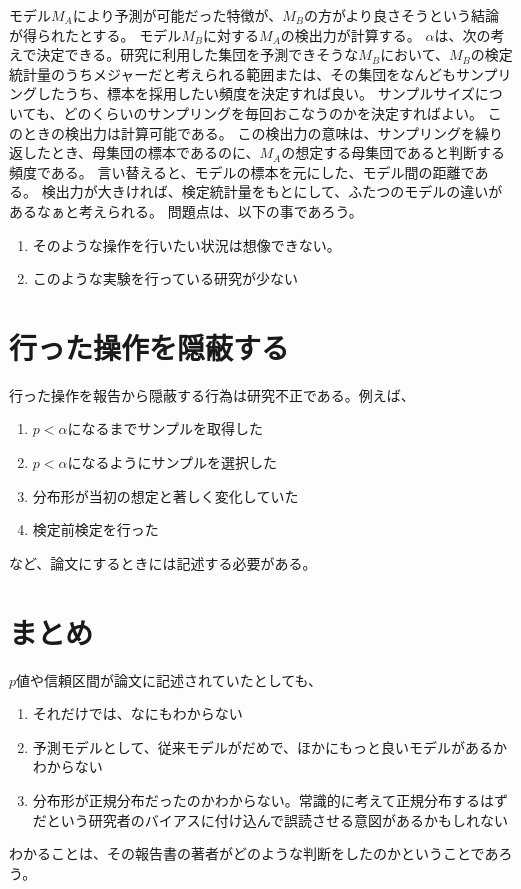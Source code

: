 モデル$M_A$により予測が可能だった特徴が、$M_B$の方がより良さそうという結論が得られたとする。
モデル$M_B$に対する$M_A$の検出力が計算する。
$\alpha$は、次の考えで決定できる。研究に利用した集団を予測できそうな$M_B$において、$M_B$の検定統計量のうちメジャーだと考えられる範囲または、その集団をなんどもサンプリングしたうち、標本を採用したい頻度を決定すれば良い。
サンプルサイズについても、どのくらいのサンプリングを毎回おこなうのかを決定すればよい。
このときの検出力は計算可能である。
この検出力の意味は、サンプリングを繰り返したとき、母集団の標本であるのに、$M_A$の想定する母集団であると判断する頻度である。
言い替えると、モデルの標本を元にした、モデル間の距離である。
検出力が大きければ、検定統計量をもとにして、ふたつのモデルの違いがあるなぁと考えられる。
\fi
{}
問題点は、以下の事であろう。
\begin{enumerate}
 \item そのような操作を行いたい状況は想像できない。
 \item このような実験を行っている研究が少ない
\end{enumerate}
\fi 

\section{行った操作を隠蔽する}
行った操作を報告から隠蔽する行為は研究不正である。例えば、
\begin{enumerate}
 \item $p<\alpha$になるまでサンプルを取得した
 \item $p<\alpha$になるようにサンプルを選択した
 \item 分布形が当初の想定と著しく変化していた
 \item 検定前検定を行った
\end{enumerate}
など、論文にするときには記述する必要がある。


\section{まとめ}
$p$値や信頼区間が論文に記述されていたとしても、
\begin{enumerate}
 \item それだけでは、なにもわからない
 \item 予測モデルとして、従来モデルがだめで、ほかにもっと良いモデルがあるかわからない
 \item 分布形が正規分布だったのかわからない。常識的に考えて正規分布するはずだという研究者のバイアスに付け込んで誤読させる意図があるかもしれない
\end{enumerate}

わかることは、その報告書の著者がどのような判断をしたのかということであろう。